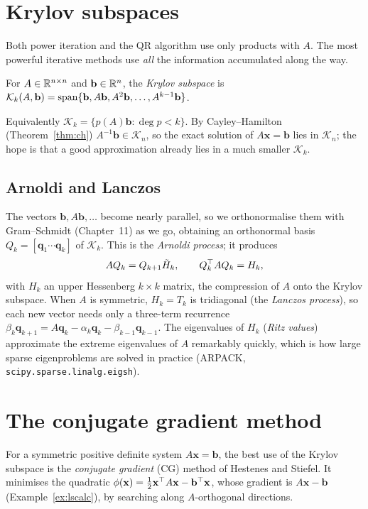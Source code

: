 \section{Krylov subspaces}

Both power iteration and the QR algorithm use only products with $A$. The most powerful iterative methods use \emph{all} the information accumulated along the way.

\begin{definition}
For $A\in\mathbb{R}^{n\times n}$ and $\mathbf{b}\in\mathbb{R}^n$, the \emph{Krylov subspace} is $\mathcal{K}_k(A,\mathbf{b})=\operatorname{span}\{\mathbf{b},A\mathbf{b},A^2\mathbf{b},\dots,A^{k-1}\mathbf{b}\}$.
\end{definition}

Equivalently $\mathcal{K}_k=\{p(A)\mathbf{b}:\deg p<k\}$. By Cayley--Hamilton (Theorem~\ref{thm:ch}) $A^{-1}\mathbf{b}\in\mathcal{K}_n$, so the exact solution of $A\mathbf{x}=\mathbf{b}$ lies in $\mathcal{K}_n$; the hope is that a good approximation already lies in a much smaller $\mathcal{K}_k$.

\subsection*{Arnoldi and Lanczos}

The vectors $\mathbf{b},A\mathbf{b},\dots$ become nearly parallel, so we orthonormalise them with Gram--Schmidt (Chapter~11) as we go, obtaining an orthonormal basis $Q_k=[\mathbf{q}_1\cdots\mathbf{q}_k]$ of $\mathcal{K}_k$. This is the \emph{Arnoldi process}; it produces
\[ AQ_k=Q_{k+1}\tilde H_k,\qquad Q_k^{\top} AQ_k=H_k, \]
with $H_k$ an upper Hessenberg $k\times k$ matrix, the compression of $A$ onto the Krylov subspace. When $A$ is symmetric, $H_k=T_k$ is tridiagonal (the \emph{Lanczos process}), so each new vector needs only a three-term recurrence $\beta_k\mathbf{q}_{k+1}=A\mathbf{q}_k-\alpha_k\mathbf{q}_k-\beta_{k-1}\mathbf{q}_{k-1}$. The eigenvalues of $H_k$ (\emph{Ritz values}) approximate the extreme eigenvalues of $A$ remarkably quickly, which is how large sparse eigenproblems are solved in practice (ARPACK, \texttt{scipy.sparse.linalg.eigsh}).

\section{The conjugate gradient method}

For a symmetric positive definite system $A\mathbf{x}=\mathbf{b}$, the best use of the Krylov subspace is the \emph{conjugate gradient} (CG) method of Hestenes and Stiefel. It minimises the quadratic $\phi(\mathbf{x})=\tfrac12\mathbf{x}^{\top} A\mathbf{x}-\mathbf{b}^{\top}\mathbf{x}$, whose gradient is $A\mathbf{x}-\mathbf{b}$ (Example~\ref{ex:lscalc}), by searching along $A$-orthogonal directions.

